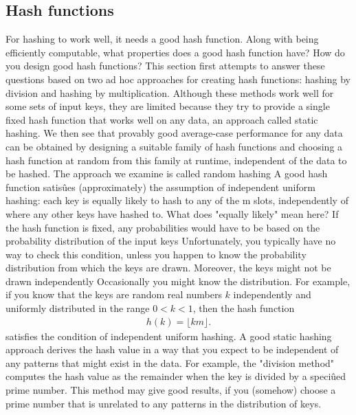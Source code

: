 \documentclass{report}
\begin{document}
\subsection{Hash functions}
\bigbreak \noindent 
For hashing to work well, it needs a good hash function. Along with being efficiently computable, what properties does a good hash function have? How do you design good hash functions?
\bigbreak \noindent 
This section first attempts to answer these questions based on two ad hoc approaches for creating hash functions: hashing by division and hashing by multiplication.
\bigbreak \noindent 
Although these methods work well for some sets of input keys, they are limited because they try to provide a single fixed hash function that works well on any data, an approach called static hashing.
\bigbreak \noindent 
We then see that provably good average-case performance for any data can be obtained by designing a suitable family of hash functions and choosing a hash function at random from this family at runtime, independent of the data to be hashed. The approach we examine is called random hashing
\bigbreak \noindent 
A good hash function satisûes (approximately) the assumption of independent uniform hashing: each key is equally likely to hash to any of the m slots, independently of where any other keys have hashed to. What does "equally likely" mean here? If the hash function is fixed, any probabilities would have to be based on the probability distribution of the input keys
\bigbreak \noindent 
Unfortunately, you typically have no way to check this condition, unless you happen to know the probability distribution from which the keys are drawn. Moreover, the keys might not be drawn independently
\bigbreak \noindent 
Occasionally you might know the distribution. For example, if you know that
the keys are random real numbers $k$ independently and uniformly distributed in the
range $0 < k < 1$, then the hash function
\begin{align*}
    h(k) = \lfloor km \rfloor
.\end{align*}
\bigbreak \noindent 
satisfies the condition of independent uniform hashing.
\bigbreak \noindent 
A good static hashing approach derives the hash value in a way that you expect to be independent of any patterns that might exist in the data. For example, the "division method" computes the hash value as the remainder when the key is divided by a speciûed prime number. This method may give good results, if you (somehow) choose a prime number that is unrelated to any patterns in the distribution of keys.
\bigbreak \noindent 
\end{document}
